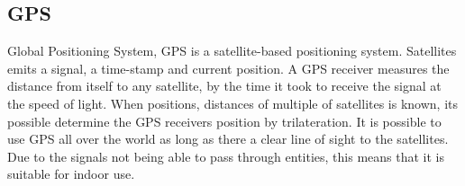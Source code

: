 
\subsection{GPS}

Global Positioning System, GPS is a satellite-based positioning system. Satellites emits a signal, a time-stamp and current position. A GPS receiver measures the distance from itself to any satellite, by the time it took to receive the signal at the speed of light. When positions, distances of multiple of satellites is known, its possible determine the GPS receivers position by trilateration. \cite{Dempster2013} It is possible to use GPS all over the world as long as there a clear line of sight to the satellites. Due to the signals not being able to pass through entities, this means that it is suitable for indoor use. \cite{GPS_about}